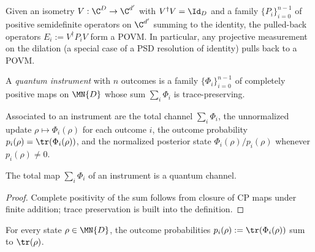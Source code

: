 \begin{definition}
    \label{def:povm_of_psd_resolution_of_identity}
    \leanok
    Given an isometry $V:\C^D\to\C^{d'}$ with $V^\dagger V=\Id_D$
    and a family $\{P_i\}_{i=0}^{n-1}$ of positive semidefinite operators on
    $\C^{d'}$ summing to the identity, the pulled-back operators
    $E_i:=V^\dagger P_iV$ form a POVM. In particular, any projective
    measurement on the dilation (a special case of a PSD resolution of
    identity) pulls back to a POVM.
\end{definition}

\begin{definition}\label{def:instrument}
    \leanok
    A \emph{quantum instrument} with $n$ outcomes is a family
    $\{\Phi_i\}_{i=0}^{n-1}$ of completely positive maps on $\MN{D}$ whose
    sum $\sum_i\Phi_i$ is trace-preserving.
\end{definition}

\begin{definition}\label{def:instrument_operations}
    \leanok
    Associated to an instrument are the total channel $\sum_i\Phi_i$, the
    unnormalized update $\rho\mapsto\Phi_i(\rho)$ for each outcome $i$, the
    outcome probability $p_i(\rho)=\tr(\Phi_i(\rho))$, and the normalized
    posterior state $\Phi_i(\rho)/p_i(\rho)$ whenever $p_i(\rho)\neq0$.
\end{definition}

\begin{theorem}
    \label{thm:instrument_total_is_channel}
    \leanok
    The total map $\sum_i\Phi_i$ of an instrument is a quantum channel.
\end{theorem}

\begin{proof}
    \leanok
    Complete positivity of the sum follows from closure of CP maps under
    finite addition; trace preservation is built into the definition.
\end{proof}

\begin{theorem}
    \label{thm:instrument_sum_probability}
    \leanok
    For every state $\rho\in\MN{D}$, the outcome probabilities
    $p_i(\rho):=\tr(\Phi_i(\rho))$ sum to $\tr(\rho)$.
\end{theorem}

